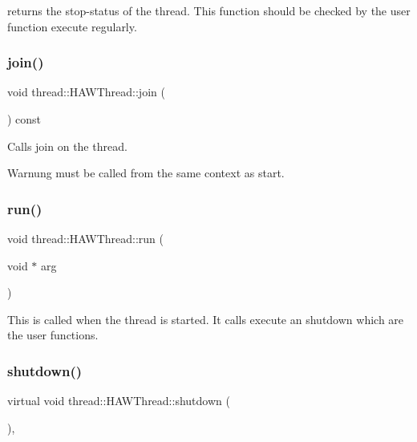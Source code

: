 returns the stop-\/status of the thread. This function should be checked by the user function execute regularly. \hypertarget{classthread_1_1_h_a_w_thread_adbc0234a7b8eb2271a5cb4a7b8090956}{}\label{classthread_1_1_h_a_w_thread_adbc0234a7b8eb2271a5cb4a7b8090956} 
\subsubsection{\texorpdfstring{join()}{join()}}
{\footnotesize\ttfamily void thread\+::\+H\+A\+W\+Thread\+::join (\begin{DoxyParamCaption}{ }\end{DoxyParamCaption}) const}

Calls join on the thread. \begin{DoxyWarning}{Warnung}
must be called from the same context as start. 
\end{DoxyWarning}
\hypertarget{classthread_1_1_h_a_w_thread_a9a3e17be59877d350e310eb19c52679b}{}\label{classthread_1_1_h_a_w_thread_a9a3e17be59877d350e310eb19c52679b} 
\subsubsection{\texorpdfstring{run()}{run()}}
{\footnotesize\ttfamily void thread\+::\+H\+A\+W\+Thread\+::run (\begin{DoxyParamCaption}\item[{void $\ast$}]{arg }\end{DoxyParamCaption})\hspace{0.3cm}{\ttfamily [protected]}}

This is called when the thread is started. It calls execute an shutdown which are the user functions. \hypertarget{classthread_1_1_h_a_w_thread_a843ee9493a41cec7e932fdec67a3b244}{}\label{classthread_1_1_h_a_w_thread_a843ee9493a41cec7e932fdec67a3b244} 
\subsubsection{\texorpdfstring{shutdown()}{shutdown()}}
{\footnotesize\ttfamily virtual void thread\+::\+H\+A\+W\+Thread\+::shutdown (\begin{DoxyParamCaption}{ }\end{DoxyParamCaption})\hspace{0.3cm}{\ttfamily [protected]}, {}}

